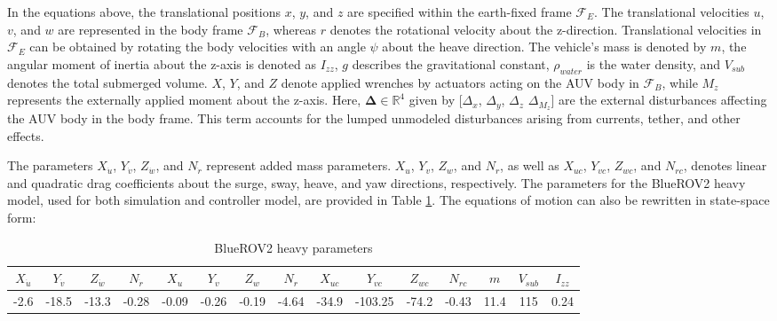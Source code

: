In the equations above, the translational positions $x$, $y$, and $z$ are specified within the earth-fixed frame $\mathcal{F}_E$. The translational velocities $u$, $v$, and $w$ are represented in the body frame $\mathcal{F}_B$, whereas $r$ denotes the rotational velocity about the z-direction. Translational velocities in $\mathcal{F}_E$ can be obtained by rotating the body velocities with an angle $\psi$ about the heave direction. The vehicle's mass is denoted by $m$, the angular moment of inertia about the z-axis is denoted as $I_{zz}$, $g$ describes the gravitational constant, $\rho_{water}$ is the water density, and $V_{sub}$ denotes the total submerged volume. $X$, $Y$, and $Z$ denote applied wrenches by actuators acting on the \ac{AUV} body in $\mathcal{F}_B$, while $M_z$ represents the externally applied moment about the z-axis. Here, $\mathbf{\Delta}  \in \mathbb{R}^{4}$ given by [$\Delta_{x}$, $\Delta_{y}$, $\Delta_{z}$ $\Delta_{M_z}$] are the external disturbances affecting the \ac{AUV} body in the body frame. This term accounts for the lumped unmodeled disturbances arising from currents, tether, and other effects.


The parameters $X_{\dot{u}}$, $Y_{\dot{v}}$, $Z_{\dot{w}}$, and $N_{\dot{r}}$ represent added mass parameters. $X_{u}$, $Y_{v}$, $Z_{w}$, and $N_{r}$, as well as $X_{uc}$, $Y_{vc}$, $Z_{wc}$, and $N_{rc}$, denotes linear and quadratic drag coefficients about the surge, sway, heave, and yaw directions, respectively. The parameters for the BlueROV2 heavy model, used for both simulation and controller model, are provided in Table \ref{tab:brovparams}. The equations of motion can also be rewritten in state-space form:



\begin{table}[t]
\caption{BlueROV2 heavy parameters}
\centering
\normalsize
\setlength{\tabcolsep}{4pt} %
\renewcommand{\arraystretch}{1.5} %
\begin{tabular}{|c|c|c|c|c|c|c|c|c|c|c|c|c|c|c|}
\hline
$X_{\dot{u}}$ & $Y_{\dot{v}}$ & $Z_{\dot{w}}$ & $N_{\dot{r}}$ & 
$X_{u}$ & $Y_{v}$ & $Z_{w}$ & $N_{r}$ & $X_{uc}$ & $Y_{vc}$ & $Z_{wc}$ & $N_{rc}$ & $m$ & $V_{sub}$ & $I_{zz}$ \\ \hline
-2.6 & -18.5 & -13.3 & -0.28 & 
-0.09 & -0.26 & -0.19 & -4.64 & -34.9 & -103.25 & -74.2 & -0.43 & 11.4 & 115 & 0.24 \\ \hline
\end{tabular}

\label{tab:brovparams}
\vspace{-0.3cm}
\end{table}

